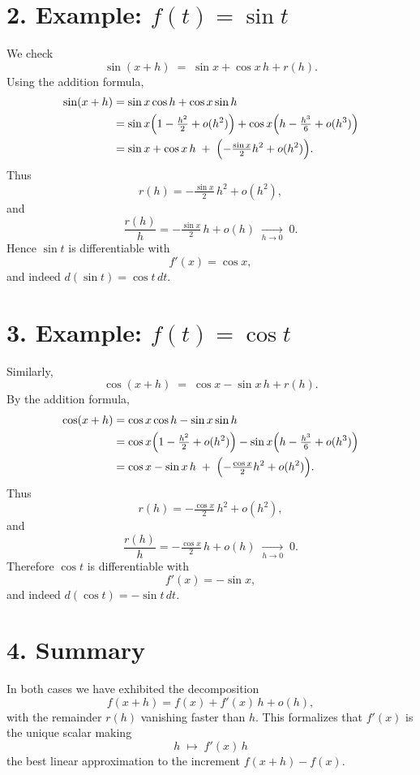 \documentclass[11pt,openany]{article}
\begin{document}
\section*{2. Example: \(f(t)=\sin t\)}

We check
\[
\sin(x+h)\;=\;\sin x + \cos x\,h + r(h).
\]
Using the addition formula,
\begin{align*}
	\sin(x+h)
	&= \sin x\cos h + \cos x\sin h\\
	&= \sin x\Bigl(1 - \tfrac{h^2}{2}+o(h^2)\Bigr)
	+ \cos x\Bigl(h - \tfrac{h^3}{6}+o(h^3)\Bigr)\\
	&= \sin x + \cos x\,h
	\;+\;\Bigl(-\tfrac{\sin x}{2}h^2 + o(h^2)\Bigr).
\end{align*}
Thus
\[
r(h) = -\tfrac{\sin x}{2}\,h^2 + o(h^2),
\]
and
\[
\frac{r(h)}{h} = -\tfrac{\sin x}{2}\,h + o(h) \;\xrightarrow[h\to0]{}\;0.
\]
Hence \(\sin t\) is differentiable with
\[
f'(x) = \cos x,
\]
and indeed \(d(\sin t)=\cos t\,dt\).

\section*{3. Example: \(f(t)=\cos t\)}

Similarly,
\[
\cos(x+h)\;=\;\cos x - \sin x\,h + r(h).
\]
By the addition formula,
\begin{align*}
	\cos(x+h)
	&= \cos x\cos h - \sin x\sin h\\
	&= \cos x\Bigl(1 - \tfrac{h^2}{2}+o(h^2)\Bigr)
	- \sin x\Bigl(h - \tfrac{h^3}{6}+o(h^3)\Bigr)\\
	&= \cos x - \sin x\,h
	\;+\;\Bigl(-\tfrac{\cos x}{2}h^2 + o(h^2)\Bigr).
\end{align*}
Thus
\[
r(h) = -\tfrac{\cos x}{2}\,h^2 + o(h^2),
\]
and
\[
\frac{r(h)}{h} = -\tfrac{\cos x}{2}\,h + o(h) \;\xrightarrow[h\to0]{}\;0.
\]
Therefore \(\cos t\) is differentiable with
\[
f'(x) = -\sin x,
\]
and indeed \(d(\cos t)=-\sin t\,dt\).

\section*{4. Summary}

In both cases we have exhibited the decomposition
\[
f(x+h) = f(x) + f'(x)\,h + o(h),
\]
with the remainder \(r(h)\) vanishing faster than \(h\).  This formalizes that \(f'(x)\) is the unique scalar making
\[
h \;\mapsto\; f'(x)\,h
\]
the best linear approximation to the increment \(f(x+h)-f(x)\).


\newpage
\medskip
\end{document}
